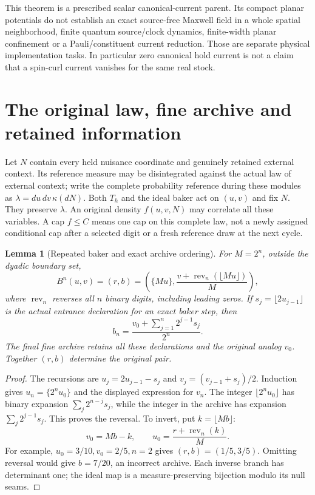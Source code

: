 \documentclass[11pt]{article}
\numberwithin{equation}{section}
\newtheorem{lemma}[theorem]{Lemma}
\theoremstyle{definition}
\theoremstyle{remark}
\begin{document}
This theorem is a prescribed scalar canonical-current
parent. Its compact planar potentials do not establish
an exact source-free Maxwell field in a whole spatial
neighborhood, finite quantum source/clock dynamics,
finite-width planar confinement or a Pauli/constituent
current reduction. Those are separate physical
implementation tasks. In particular zero canonical
hold current is not a claim that a spin-curl current
vanishes for the same real stock.

\section{The original law, fine archive and retained information}
\label{p2c:sec:law}

Let $N$ contain every held nuisance coordinate and genuinely
retained external context. Its reference measure may be
disintegrated against the actual law of external context;
write the complete probability reference during these modules as
$\lambda=du\,dv\,\kappa(dN)$. Both $T_h$ and the ideal baker
act on $(u,v)$ and fix $N$. They preserve $\lambda$.
An original density $f(u,v,N)$ may correlate all these
variables. A cap $f\leq C$ means one cap on this complete
law, not a newly assigned conditional cap after a selected
digit or a fresh reference draw at the next cycle.

\begin{lemma}[Repeated baker and exact archive ordering]
\label{p2c:lem:digits}
For $M=2^n$, outside the dyadic boundary set,
\begin{equation}\label{p2c:eq:digits}
 B^n(u,v)=
 \left(r,b\right)=
 \left(\{Mu\},
       \frac{v+\operatorname{rev}_n(\lfloor Mu\rfloor)}{M}\right),
\end{equation}
where $\operatorname{rev}_n$ reverses all $n$ binary digits,
including leading zeros. If
$s_j=\lfloor2u_{j-1}\rfloor$ is the actual entrance
declaration for an exact baker step, then
\[
 b_n=\frac{v_0+\sum_{j=1}^n2^{j-1}s_j}{2^n}.
\]
The final fine archive retains all these declarations and
the original analog $v_0$. Together $(r,b)$ determine
the original pair.
\end{lemma}

\begin{proof}
The recursions are $u_j=2u_{j-1}-s_j$ and
$v_j=(v_{j-1}+s_j)/2$. Induction gives
$u_n=\{2^nu_0\}$ and the displayed expression for $v_n$.
The integer $\lfloor2^nu_0\rfloor$ has binary expansion
$\sum_j2^{n-j}s_j$, while the integer in the archive
has expansion $\sum_j2^{j-1}s_j$. This proves the
reversal. To invert, put $k=\lfloor Mb\rfloor$:
\[
 v_0=Mb-k,\qquad
 u_0=\frac{r+\operatorname{rev}_n(k)}{M}.
\]
For example, $u_0=3/10,v_0=2/5,n=2$ gives
$(r,b)=(1/5,3/5)$. Omitting reversal would give
$b=7/20$, an incorrect archive. Each inverse branch
has determinant one; the ideal map is a
measure-preserving bijection modulo its null seams.
\end{proof}
\end{document}
